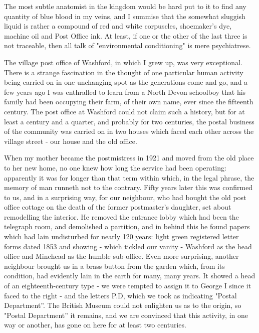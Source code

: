 
The most subtle anatomist in the kingdom would be hard put to it to find any quantity of blue blood in my veins, and I summise that the somewhat sluggish liquid is rather a compound of red and white corpuscles, shoemaker's dye, machine oil and Post Office ink. At least, if one or the other of the last three is not traceable, then all talk of "environmental conditioning" is mere psychiatrese.

The village post office of Washford, in which I grew up, was very exceptional. There is a strange fascination in the thought of one particular human activity being carried on in one unchanging spot as the generations come and go, and a few years ago I was enthralled to learn from a North Devon schoolboy that his family had been occupying their farm, of their own name, ever since the fifteenth century. The post office at Washford could not claim such a history, but for at least a century and a quarter, and probably for two centuries, the postal business of the community was carried on in two houses which faced each other across the village street - our house and the old office.

When my mother became the postmistress in 1921 and moved from the old place to her new home, no one knew how long the service had been operating: apparently it was for longer than that term within which, in the legal phrase, the memory of man runneth not to the contrary. Fifty years later this was confirmed to us, and in a surprising way, for our neighbour, who had bought the old post office cottage on the death of the former postmaster's daughter, set about remodelling the interior. He removed the entrance lobby which had been the telegraph room, and demolished a partition, and in behind this he found papers which had lain undisturbed for nearly 120 years: light green registered letter forms dated 1853 and showing - which tickled our vanity - Washford as the head office and Minehead as the humble sub-office. Even more surprising, another neighbour brought us in a brass button from the garden which, from its condition, had evidently lain in the earth for many, many years. It showed a head of an eighteenth-century type - we were tempted to assign it to George I since it faced to the right - and the letters P.D, which we took as indicating "Postal Department”. The British Museum could not enlighten us as to the origin, so "Postal Department” it remains, and we are convinced that this activity, in one way or another, has gone on here for at least two centuries.


